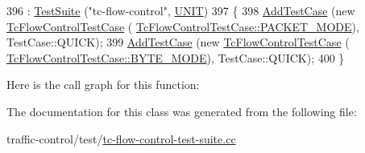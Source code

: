 \begin{DoxyCode}
396     : \hyperlink{classns3_1_1TestSuite_a904b0c40583b744d30908aeb94636d1a}{TestSuite} (\textcolor{stringliteral}{"tc-flow-control"}, \hyperlink{classns3_1_1TestSuite_a1ebfcab34ec8161e085e8e3a1855eae0a3885375a3787abf60431f8454b3cadbd}{UNIT})
397   \{
398     \hyperlink{classns3_1_1TestCase_a3718088e3eefd5d6454569d2e0ddd835}{AddTestCase} (\textcolor{keyword}{new} \hyperlink{classTcFlowControlTestCase}{TcFlowControlTestCase} (
      \hyperlink{classTcFlowControlTestCase_a63146d60b911dd039c9cf960cbddb458a294d1e27d6e81fc7a19f37ec1f5ba1d8}{TcFlowControlTestCase::PACKET\_MODE}), TestCase::QUICK);
399     \hyperlink{classns3_1_1TestCase_a3718088e3eefd5d6454569d2e0ddd835}{AddTestCase} (\textcolor{keyword}{new} \hyperlink{classTcFlowControlTestCase}{TcFlowControlTestCase} (
      \hyperlink{classTcFlowControlTestCase_a63146d60b911dd039c9cf960cbddb458a10186dff385e013c5c5351795fdf6558}{TcFlowControlTestCase::BYTE\_MODE}), TestCase::QUICK);
400   \}
\end{DoxyCode}


Here is the call graph for this function\+:




The documentation for this class was generated from the following file\+:\begin{DoxyCompactItemize}
\item 
traffic-\/control/test/\hyperlink{tc-flow-control-test-suite_8cc}{tc-\/flow-\/control-\/test-\/suite.\+cc}\end{DoxyCompactItemize}
